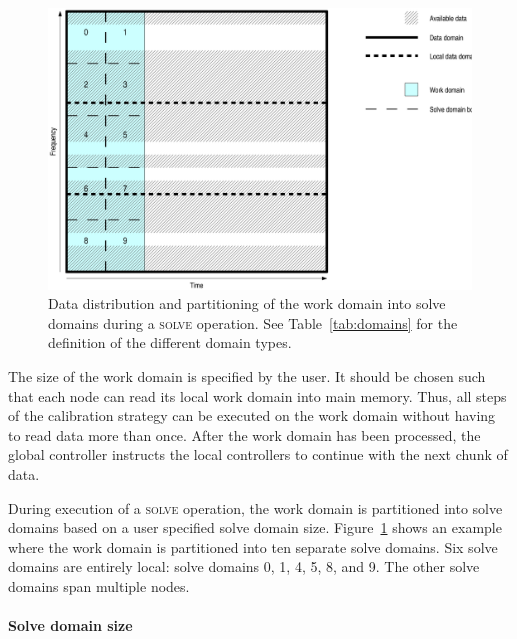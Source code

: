\documentclass[10pt]{lofar}
\newcommand{\solve}{\textsc{solve}\xspace}
\begin{document}
\begin{figure}[htbp]
\centering
\includegraphics[scale=0.5]{images/solve_domains.ps}
\caption{Data distribution and partitioning of the work domain into solve
domains during a \solve operation. See Table~\ref{tab:domains} for the definition
of the different domain types.}
\label{fig:domains}
\end{figure}

The size of the work domain is specified by the user. It should be chosen such
that each node can read its local work domain into main memory. Thus, all steps
of the calibration strategy can be executed on the work domain without having to
read data more than once. After the work domain has been processed, the global
controller instructs the local controllers to continue with the next chunk of
data.

During execution of a \solve operation, the work domain is partitioned into
solve domains based on a user specified solve domain size.
Figure~\ref{fig:domains} shows an example where the work domain is partitioned
into ten separate solve domains. Six solve domains are entirely local: solve
domains 0, 1, 4, 5, 8, and 9. The other solve domains span multiple nodes.


\paragraph{Solve domain size}
\end{document}
